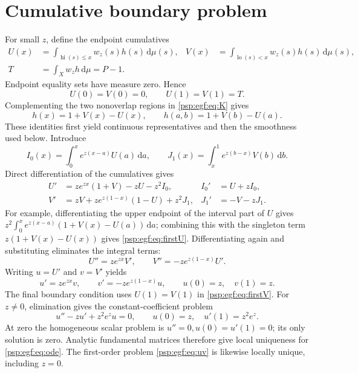 \documentclass[11pt,letterpaper]{article}
\numberwithin{equation}{section}
\theoremstyle{remark}\newtheorem{remark}[theorem]{Remark}
\newcommand{\dd}{\,\mathrm d}
\newcommand{\lo}{\operatorname{lo}}
\newcommand{\hi}{\operatorname{hi}}
\begin{document}
\section{Cumulative boundary problem}\label{psp:egf:sec:bvp}
For small $z$, define the endpoint cumulatives
\begin{align*}
 U(x)&=\int_{\hi(s)\leq x}w_z(s)h(s)\dd\mu(s),&
 V(x)&=\int_{\lo(s)<x}w_z(s)h(s)\dd\mu(s),\\
 T&=\int_Xw_z h\dd\mu=P-1.
\end{align*}
Endpoint equality sets have measure zero. Hence
\begin{equation}\label{psp:egf:eq:ends}
 U(0)=V(0)=0,\qquad U(1)=V(1)=T.
\end{equation}
Complementing the two nonoverlap regions in \eqref{psp:egf:eq:K} gives
\begin{equation}\label{psp:egf:eq:hUV}
 h(x)=1+V(x)-U(x),\qquad h(a,b)=1+V(b)-U(a).
\end{equation}
These identities first yield continuous representatives and then the
smoothness used below. Introduce
\[
 I_0(x)=\int_0^x e^{z(x-a)}U(a)\dd a,\qquad
 J_1(x)=\int_x^1 e^{z(b-x)}V(b)\dd b.
\]
Direct differentiation of the cumulatives gives
\begin{align}
 U'&=ze^{zx}(1+V)-zU-z^2I_0, & I_0'&=U+zI_0,\label{psp:egf:eq:firstU}\\
 V'&=zV+ze^{z(1-x)}(1-U)+z^2J_1, & J_1'&=-V-zJ_1.
 \label{psp:egf:eq:firstV}
\end{align}
For example, differentiating the upper endpoint of the interval part of
$U$ gives $z^2\int_0^xe^{z(x-a)}(1+V(x)-U(a))\dd a$; combining this with
the singleton term $z(1+V(x)-U(x))$ gives \eqref{psp:egf:eq:firstU}.
Differentiating again and substituting eliminates the integral terms:
\begin{equation}\label{psp:egf:eq:secondUV}
 U''=ze^{zx}V',\qquad V''=-ze^{z(1-x)}U'.
\end{equation}
Writing $u=U'$ and $v=V'$ yields
\begin{equation}\label{psp:egf:eq:uv}
 u'=ze^{zx}v,\qquad v'=-ze^{z(1-x)}u,
 \qquad u(0)=z,\quad v(1)=z.
\end{equation}
The final boundary condition uses $U(1)=V(1)$ in \eqref{psp:egf:eq:firstV}.
For $z\ne0$, elimination gives the constant-coefficient problem
\begin{equation}\label{psp:egf:eq:ode}
 u''-zu'+z^2e^zu=0,\qquad u(0)=z,\quad u'(1)=z^2e^z.
\end{equation}
At zero the homogeneous scalar problem is $u''=0,u(0)=u'(1)=0$;
its only solution is zero. Analytic fundamental matrices therefore give
local uniqueness for \eqref{psp:egf:eq:ode}. The first-order problem
\eqref{psp:egf:eq:uv} is likewise locally unique, including $z=0$.
\end{document}
